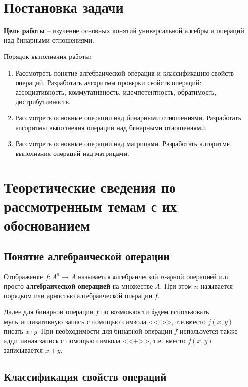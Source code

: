 \documentclass[bachelor, och, labwork]{shiza}
\begin{document}

\section{Постановка задачи}

    \textbf{Цель работы} -- изучение основных понятий универсальной алгебры и операций над бинарными отношениями. 

    Порядок выполнения работы:
    \begin{enumerate}
        \item Рассмотреть понятие алгебраической операции и классификацию свойств операций. Разработать
        алгоритмы проверки свойств операций: ассоциативность, коммутативность, идемпотентность, обратимость, дистрибутивность.
        \item Рассмотреть основные операции над бинарными отношениями. Разработать алгоритмы выполнения
        операции над бинарными отношениями.
        \item Рассмотреть основные операции над матрицами. Разработать алгоритмы выполнения операций над матрицами.
    \end{enumerate}

\section{Теоретические сведения по рассмотренным темам с их обоснованием}

    \subsection{Понятие алгебраической операции}

    Отображение $f : A^n \rightarrow A$ называется алгебраической $n$-арной операцией или просто 
    \textbf{алгебраической операцией} на множестве $A$. При этом $n$ называется порядком или арностью алгебраической операции $f$.
    
    Далее для бинарной операции $f$ по возможности будем использовать мультипликативную запись с помощью символа <<$\cdot$>>,
    т.е.вместо $f(x,y)$ писать $x \cdot y$. При необходимости для бинарной операции $f$ используется также аддитивная запись
    с помощью символа <<$ + $>>, т.е. вместо $f(x,y)$ записывается $x + y$.

    
    \subsection{Классификация свойств операций}
\end{document}

